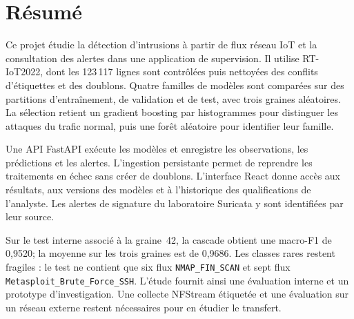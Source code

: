 \chapter*{Résumé}

Ce projet étudie la détection d'intrusions à partir de flux réseau IoT et la
consultation des alertes dans une application de supervision. Il utilise
RT-IoT2022, dont les 123\,117 lignes sont contrôlées puis nettoyées des conflits
d'étiquettes et des doublons. Quatre familles de modèles sont comparées sur des
partitions d'entraînement, de validation et de test, avec trois graines
aléatoires. La sélection retient un gradient boosting par histogrammes pour
distinguer les attaques du trafic normal, puis une forêt aléatoire pour
identifier leur famille.

Une API FastAPI exécute les modèles et enregistre les observations, les
prédictions et les alertes. L'ingestion persistante permet de reprendre les
traitements en échec sans créer de doublons. L'interface React donne accès aux
résultats, aux versions des modèles et à l'historique des qualifications de
l'analyste. Les alertes de signature du laboratoire Suricata y sont identifiées
par leur source.

Sur le test interne associé à la graine~42, la cascade obtient une macro-F1 de
0,9520; la moyenne sur les trois graines est de 0,9686. Les classes rares restent
fragiles : le test ne contient que six flux \texttt{NMAP\_FIN\_SCAN} et sept flux
\texttt{Metasploit\_Brute\_Force\_SSH}. L'étude fournit ainsi une évaluation interne
et un prototype d'investigation. Une collecte NFStream étiquetée et une
évaluation sur un réseau externe restent nécessaires pour en étudier le transfert.

